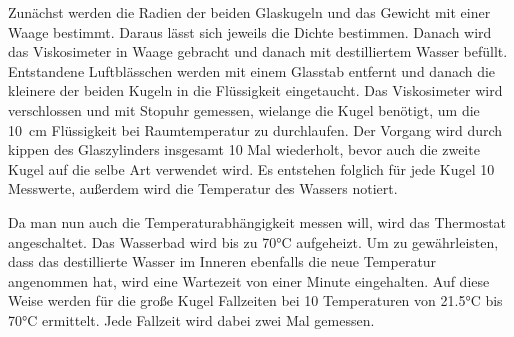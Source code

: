 Zunächst werden die Radien der beiden Glaskugeln und das Gewicht mit einer 
Waage bestimmt. Daraus lässt sich jeweils die Dichte bestimmen. 
Danach wird das Viskosimeter in Waage gebracht und danach mit destilliertem Wasser 
befüllt. Entstandene Luftblässchen werden mit einem Glasstab entfernt und 
danach die kleinere der beiden Kugeln in die Flüssigkeit eingetaucht. Das 
Viskosimeter wird verschlossen und mit Stopuhr gemessen, wielange die Kugel benötigt, 
um die \SI{10}{\centi\meter} Flüssigkeit bei Raumtemperatur zu durchlaufen. 
Der Vorgang wird durch kippen des Glaszylinders insgesamt 10 Mal wiederholt, 
bevor auch die zweite Kugel auf die selbe Art verwendet wird. Es entstehen 
folglich für jede Kugel 10 Messwerte, außerdem wird die Temperatur des Wassers
notiert. 

Da man nun auch die Temperaturabhängigkeit messen will, wird das Thermostat
angeschaltet. Das Wasserbad wird bis zu 70°C aufgeheizt. 
Um zu gewährleisten, dass das destillierte Wasser im Inneren ebenfalls 
die neue Temperatur angenommen hat, wird eine Wartezeit von einer Minute 
eingehalten. Auf diese Weise werden für die große Kugel Fallzeiten bei 10 
Temperaturen von 21.5°C bis 70°C ermittelt.
Jede Fallzeit wird dabei zwei Mal gemessen. 


\label{sec:Durchführung}
